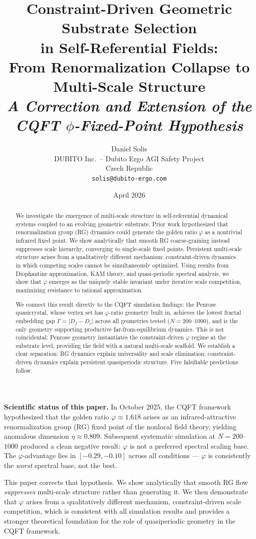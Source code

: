 \documentclass[11pt,a4paper]{article}
\title{%
  \textbf{Constraint-Driven Geometric Substrate Selection\\
  in Self-Referential Fields:}\\[6pt]
  \large From Renormalization Collapse to Multi-Scale Structure\\[6pt]
  \normalsize \textit{A Correction and Extension of the CQFT $\phi$-Fixed-Point
  Hypothesis}
}
\author{%
  Daniel Solis\\[4pt]
  \small DUBITO Inc.\ -- Dubito Ergo AGI Safety Project\\
  \small Czech Republic\\
  \small \texttt{solis@dubito-ergo.com}
}
\date{\small April 2026}
\theoremstyle{plain}
\theoremstyle{definition}
\newcommand{\phiGolden}{\varphi}
\begin{document}
\maketitle

\begin{correctionbox}
\textbf{Scientific status of this paper.}
In October 2025, the CQFT framework hypothesized that the golden ratio
$\phiGolden \approx 1.618$ arises as an infrared-attractive renormalization
group (RG) fixed point of the nonlocal field theory, yielding anomalous
dimension $\eta \approx 0.809$. Subsequent systematic simulation at
$N = 200$--$1000$ produced a clean negative result: $\phiGolden$ is not a
preferred spectral scaling base. The $\phiGolden$-advantage lies in
$[-0.29, -0.10]$ across all conditions --- $\phiGolden$ is consistently
the \emph{worst} spectral base, not the best.

This paper corrects that hypothesis. We show analytically that smooth RG
flow \emph{suppresses} multi-scale structure rather than generating it.
We then demonstrate that $\phiGolden$ arises from a qualitatively different
mechanism, constraint-driven scale competition, which is consistent
with all simulation results and provides a stronger theoretical foundation
for the role of quasiperiodic geometry in the CQFT framework.
\end{correctionbox}

\begin{abstract}
We investigate the emergence of multi-scale structure in self-referential
dynamical systems coupled to an evolving geometric substrate. Prior work
hypothesized that renormalization group (RG) dynamics could generate the
golden ratio $\phiGolden$ as a nontrivial infrared fixed point. We show
analytically that smooth RG coarse-graining instead suppresses scale
hierarchy, converging to single-scale fixed points. Persistent multi-scale
structure arises from a qualitatively different mechanism: constraint-driven
dynamics in which competing scales cannot be simultaneously optimized. Using
results from Diophantine approximation, KAM theory, and quasi-periodic
spectral analysis, we show that $\phiGolden$ emerges as the uniquely stable
invariant under iterative scale competition, maximizing resistance to rational
approximation.

We connect this result directly to the CQFT simulation findings: the
Penrose quasicrystal, whose vertex set has $\phiGolden$-ratio geometry built
in, achieves the lowest fractal embedding gap
$\Gamma = |D_f - D_c|$ across all geometries tested ($N = 200$--$1000$),
and is the only geometry supporting productive far-from-equilibrium dynamics.
This is not coincidental: Penrose geometry instantiates the
constraint-driven $\phiGolden$ regime at the substrate level, providing the
field with a natural multi-scale scaffold. We establish a clear separation:
RG dynamics explain universality and scale elimination; constraint-driven
dynamics explain persistent quasiperiodic structure. Five falsifiable
predictions follow.
\end{abstract}
\newpage
\tableofcontents
\bigskip
\end{document}
